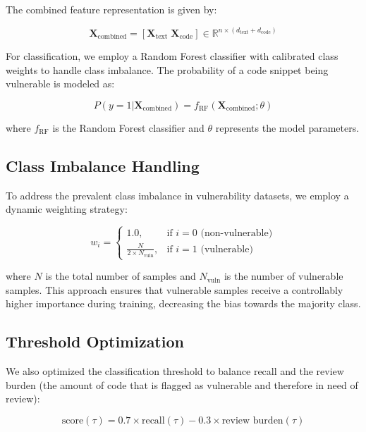 \documentclass{article}
\begin{document}
The combined feature representation is given by:

\begin{equation}
    \mathbf{X}_{\text{combined}} = [\mathbf{X}_{\text{text}} \; \mathbf{X}_{\text{code}}] \in \mathbb{R}^{n \times (d_{\text{text}} + d_{\text{code}})}
\end{equation}

For classification, we employ a Random Forest classifier with calibrated class weights to handle class imbalance. The probability of a code snippet being vulnerable is modeled as:

\begin{equation}
    P(y=1|\mathbf{X}_{\text{combined}}) = f_{\text{RF}}(\mathbf{X}_{\text{combined}}; \theta)
\end{equation}

where $f_{\text{RF}}$ is the Random Forest classifier and $\theta$ represents the model parameters.

\subsection{Class Imbalance Handling}

To address the prevalent class imbalance in vulnerability datasets, we employ a dynamic weighting strategy:

\begin{equation}
    w_i = 
    \begin{cases}
        1.0, & \text{if } i = 0 \text{ (non-vulnerable)} \\
        \frac{N}{2 \times N_{\text{vuln}}}, & \text{if } i = 1 \text{ (vulnerable)}
    \end{cases}
\end{equation}

where $N$ is the total number of samples and $N_{\text{vuln}}$ is the number of vulnerable samples. This approach ensures that vulnerable samples receive a controllably higher importance during training, decreasing the bias towards the majority class.

\subsection{Threshold Optimization}

We also optimized the classification threshold to balance recall and the review burden (the amount of code that is flagged as vulnerable and therefore in need of review):

\begin{equation}
    \text{score}(\tau) = 0.7 \times \text{recall}(\tau) - 0.3 \times \text{review burden}(\tau)
\end{equation}
\end{document}
